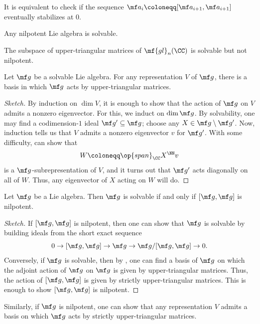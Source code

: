 \documentclass{article}
\begin{document}
\begin{remark}
	It is equivalent to check if the sequence $\mf a_i\coloneqq[\mf a_{i+1},\mf a_{i+1}]$ eventually stabilizes at $0$.
\end{remark}
\begin{example}
	Any nilpotent Lie algebra is solvable.
\end{example}
\begin{example}
	The subspace of upper-triangular matrices of $\mf{gl}_n(\CC)$ is solvable but not nilpotent.
\end{example}
\begin{theorem}[Lie] \label{thm:lie}
	Let $\mf g$ be a solvable Lie algebra. For any representation $V$ of $\mf g$, there is a basis in which $\mf g$ acts by upper-triangular matrices.
\end{theorem}
\begin{proof}[Sketch]
	By induction on $\dim V$, it is enough to show that the action of $\mf g$ on $V$ admits a nonzero eigenvector. For this, we induct on $\dim\mf g$. By solvability, one may find a codimension-$1$ ideal $\mf g'\subseteq\mf g$; choose any $X\in\mf g\setminus\mf g'$. Now, induction tells us that $V$ admits a nonzero eigenvector $v$ for $\mf g'$. With some difficulty, can show that
	\[W\coloneqq\op{span}_\CC X^\NN v\]
	is a $\mf g$-subrepresentation of $V$, and it turns out that $\mf g'$ acts diagonally on all of $W$. Thus, any eigenvector of $X$ acting on $W$ will do.
\end{proof}
\begin{corollary}
	Let $\mf g$ be a Lie algebra. Then $\mf g$ is solvable if and only if $[\mf g,\mf g]$ is nilpotent.
\end{corollary}
\begin{proof}[Sketch]
	If $[\mf g,\mf g]$ is nilpotent, then one can show that $\mf g$ is solvable by building ideals from the short exact sequence
	\[0\to[\mf g,\mf g]\to\mf g\to\mf g/[\mf g,\mf g]\to0.\]
	Conversely, if $\mf g$ is solvable, then by , one can find a basis of $\mf g$ on which the adjoint action of $\mf g$ on $\mf g$ is given by upper-triangular matrices. Thus, the action of $[\mf g,\mf g]$ is given by strictly upper-triangular matrices. This is enough to show $[\mf g,\mf g]$ is nilpotent.
\end{proof}
\begin{remark} \label{rem:nilp-to-strictly-upper-triangular}
	Similarly, if $\mf g$ is nilpotent, one can show that any representation $V$ admits a basis on which $\mf g$ acts by strictly upper-triangular matrices.
\end{remark}
\end{document}
